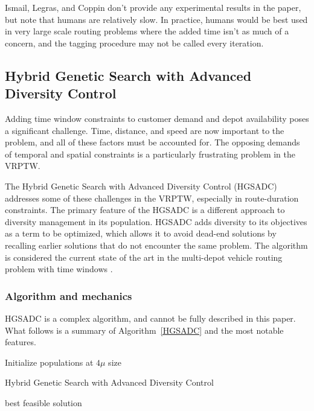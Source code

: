 \documentclass{sig-alternate}
\begin{document}
Ismail, Legras, and Coppin don't provide any experimental results in the paper, but note that humans are relatively slow. In practice, humans would be best used in very large scale routing problems where the added time isn't as much of a concern, and the tagging procedure may not be called every iteration. 

\subsection{Hybrid Genetic Search with Advanced Diversity Control}
Adding time window constraints to customer demand and depot availability poses a significant challenge. Time, distance, and speed are now important to the problem, and all of these factors must be accounted for. The opposing demands of temporal and spatial constraints is a particularly frustrating problem in the VRPTW. 

The Hybrid Genetic Search with Advanced Diversity Control (HGSADC) addresses some of these challenges in the VRPTW, especially in route-duration constraints. The primary feature of the HGSADC is a different approach to diversity management in its population. HGSADC adds diversity to its objectives as a term to be optimized, which allows it to avoid dead-end solutions by recalling earlier solutions that do not encounter the same problem. The algorithm is considered the current state of the art in the multi-depot vehicle routing problem with time windows \cite{Vidal:2013}.

\subsubsection{Algorithm and mechanics}
HGSADC is a complex algorithm, and cannot be fully described in this paper. What follows is a summary of Algorithm~\ref{HGSADC} and the most notable features.

\begin{algorithm}[t]
Initialize populations at $4\mu$ size\;
\caption{Hybrid Genetic Search with Advanced Diversity Control\label{HGSADC}}
\Return best feasible solution\;
\end{algorithm}
\end{document}
